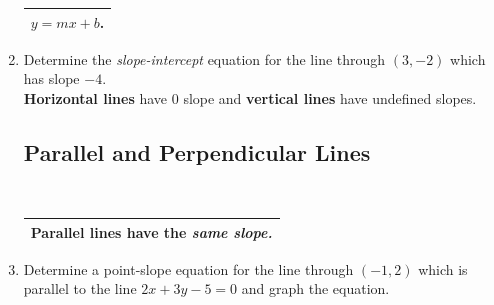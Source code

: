 \begin{enumerate}
\begin{tabular}{| l |}
 $y = mx +b$. \\ \hline
\end{tabular} 



\vspace{-.1in}
\item Determine the \emph{slope-intercept} equation for the line through $(3, -2)$ which has slope $-4$. \\[1in]



\noindent \textbf{Horizontal lines} have 0 slope and \textbf{vertical lines} have undefined slopes.\\[1in]


\subsection{Parallel and Perpendicular Lines} ~

\hspace{-.3in} \begin{tabular}{| l |  }
\hline Parallel lines have the \emph{same slope.} \\ \hline
\end{tabular} %

\vspace{-.1in}
\item Determine a point-slope equation for the line through $(-1,2)$ which is parallel to the line $2x + 3y - 5 = 0$ and graph the equation.\\
\\[1in]






\end{enumerate}
